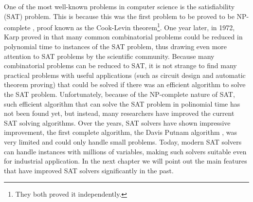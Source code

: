 \documentclass[12pt]{diicc}
\begin{document}
One of the most well-known problems in computer science is the satisfiability (SAT) problem. This is because this was the first problem to be proved to be NP-complete \cite{cook1971}, proof known as the Cook-Levin theorem\footnote[1]{They both proved it independently.}. One year later, in 1972, Karp proved in \cite{karp1972} that many common combinatorial problems could be reduced in polynomial time to instances of the SAT problem, thus drawing even more attention to SAT problems by the scientific community. Because many combinatorial problems can be reduced to SAT, it is not strange to find many practical problems with useful applications (such as circuit design and automatic theorem proving) that could be solved if there was an efficient algorithm to solve the SAT problem. Unfortunately, because of the NP-complete nature of SAT, such efficient algorithm that can solve the SAT problem in polinomial time has not been found yet, but instead, many researchers have improved the current SAT solving algorithms. Over the years, SAT solvers have shown impressive improvement, the first complete algorithm, the Davis Putnam algorithm \cite{DP1960}, was very limited and could only handle small problems. Today, modern SAT solvers can handle instances with millions of variables, making such solvers suitable even for industrial application. In the next chapter we will point out the main features that have improved SAT solvers significantly in the past.
\end{document}
